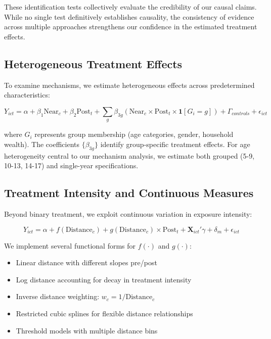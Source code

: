 \documentclass[12pt]{article}
\begin{document}
These identification tests collectively evaluate the credibility of our causal claims. While no single test definitively establishes causality, the consistency of evidence across multiple approaches strengthens our confidence in the estimated treatment effects.


\subsection{Heterogeneous Treatment Effects}

To examine mechanisms, we estimate heterogeneous effects across predetermined characteristics:

\begin{equation}
Y_{ict} = \alpha + \beta_1 \text{Near}_c + \beta_2 \text{Post}_t + \sum_{g} \beta_{3g} (\text{Near}_c \times \text{Post}_t \times \mathbf{1}[G_i = g]) + \Gamma_{controls} + \epsilon_{ict}
\label{eq:hetero}
\end{equation}

where $G_i$ represents group membership (age categories, gender, household wealth). The coefficients $\{\beta_{3g}\}$ identify group-specific treatment effects. For age heterogeneity central to our mechanism analysis, we estimate both grouped (5-9, 10-13, 14-17) and single-year specifications.

\subsection{Treatment Intensity and Continuous Measures}

Beyond binary treatment, we exploit continuous variation in exposure intensity:

\begin{equation}
Y_{ict} = \alpha + f(\text{Distance}_{c}) + g(\text{Distance}_{c}) \times \text{Post}_t + \mathbf{X}_{ict}'\gamma + \delta_m + \epsilon_{ict}
\end{equation}

We implement several functional forms for $f(\cdot)$ and $g(\cdot)$:
\begin{itemize}
\item Linear distance with different slopes pre/post
\item Log distance accounting for decay in treatment intensity
\item Inverse distance weighting: $w_c = 1/\text{Distance}_c$
\item Restricted cubic splines for flexible distance relationships
\item Threshold models with multiple distance bins
\end{itemize}
\end{document}
